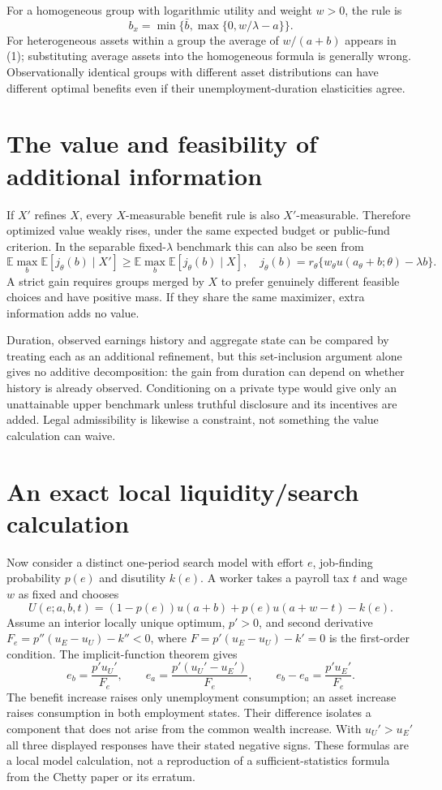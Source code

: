 \documentclass[11pt]{article}
\newcommand{\E}{\mathbb E}
\begin{document}
For a homogeneous group with logarithmic utility and weight $w>0$, the rule is
\[
 b_x=\min\{\bar b,\max\{0,w/\lambda-a\}\}.
\]
For heterogeneous assets within a group the average of $w/(a+b)$ appears in (1); substituting average assets into the homogeneous formula is generally wrong. Observationally identical groups with different asset distributions can have different optimal benefits even if their unemployment-duration elasticities agree.

\section*{The value and feasibility of additional information}
If $X'$ refines $X$, every $X$-measurable benefit rule is also $X'$-measurable. Therefore optimized value weakly rises, under the same expected budget or public-fund criterion. In the separable fixed-$\lambda$ benchmark this can also be seen from
\[
 \E\max_b\E[j_\theta(b)\mid X']\geq
 \E\max_b\E[j_\theta(b)\mid X],
 \quad j_\theta(b)=r_\theta\{w_\theta u(a_\theta+b;\theta)-\lambda b\}.
\]
A strict gain requires groups merged by $X$ to prefer genuinely different feasible choices and have positive mass. If they share the same maximizer, extra information adds no value.

Duration, observed earnings history and aggregate state can be compared by treating each as an additional refinement, but this set-inclusion argument alone gives no additive decomposition: the gain from duration can depend on whether history is already observed. Conditioning on a private type would give only an unattainable upper benchmark unless truthful disclosure and its incentives are added. Legal admissibility is likewise a constraint, not something the value calculation can waive.

\section*{An exact local liquidity/search calculation}
Now consider a distinct one-period search model with effort $e$, job-finding probability $p(e)$ and disutility $k(e)$. A worker takes a payroll tax $t$ and wage $w$ as fixed and chooses
\[
 U(e;a,b,t)=(1-p(e))u(a+b)+p(e)u(a+w-t)-k(e).
\]
Assume an interior locally unique optimum, $p'>0$, and second derivative
$F_e=p''(u_E-u_U)-k''<0$, where $F=p'(u_E-u_U)-k'=0$ is the first-order condition. The implicit-function theorem gives
\[
 e_b=\frac{p'u_U'}{F_e},\qquad
 e_a=\frac{p'(u_U'-u_E')}{F_e},\qquad
 e_b-e_a=\frac{p'u_E'}{F_e}. \tag{2}
\]
The benefit increase raises only unemployment consumption; an asset increase raises consumption in both employment states. Their difference isolates a component that does not arise from the common wealth increase. With $u_U'>u_E'$ all three displayed responses have their stated negative signs. These formulas are a local model calculation, not a reproduction of a sufficient-statistics formula from the Chetty paper or its erratum.
\end{document}
